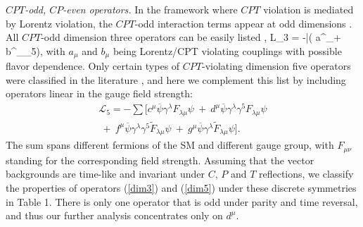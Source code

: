 \documentclass[prl,twocolumn,tightenlines,preprintnumbers,floatfix,nofootinbib]{revtex4}
\def\ba{\begin{eqnarray}}
\def\ea{\end{eqnarray}}
\begin{document}
{\em $CPT$-odd, $CP$-even operators.} In the framework where $CPT$ violation 
is mediated by Lorentz violation, the
$CPT$-odd interaction terms appear at odd dimensions \cite{Kost}. 
All $CPT$-odd dimension three operators can be easily listed \cite{Kost}, 
\be
{\cal L}_3 = -\sum \bar \psi( a^\mu \gamma_\mu + b^\mu \gamma_\mu \gamma_5)\psi,
\label{dim3}
\ee
with $a_\mu$ and $b_\mu$ being Lorentz/CPT violating couplings with possible flavor dependence. 
Only certain types of $CPT$-violating dimension five operators
were classified in the literature \cite{MP}, and here we complement this list by 
including operators linear in the gauge field strength:
\ba
\mathcal{L}_{ 5} =  -\sum [\nonumber
	c^\mu \overline{\psi} \gamma^\lambda F_{\lambda\mu} \psi
	~+~
	d^\mu \overline{\psi} \gamma^\lambda \gamma^5 F_{\lambda\mu} \psi
	\\~+~
{f}^\mu \overline{\psi} \gamma^\lambda \gamma^5
	\widetilde{F}_{\lambda\mu} \psi
	~+~
{g}^\mu  \overline{\psi} \gamma^\lambda 
	\widetilde{F}_{\lambda\mu}  \psi].
	\label{dim5}
\ea
The sum spans different fermions of the SM and different gauge group, 
with $F_{\mu\nu}$ standing for the corresponding field strength. 
Assuming that the vector backgrounds are time-like and invariant under $C$, $P$ and $T$ reflections, 
we classify the properties of operators (\ref{dim3}) and (\ref{dim5}) under these 
discrete symmetries in Table 1. There is only one operator 
that is odd under parity and time reversal, and thus our further analysis concentrates
only on $d^\mu$. 
\end{document}
